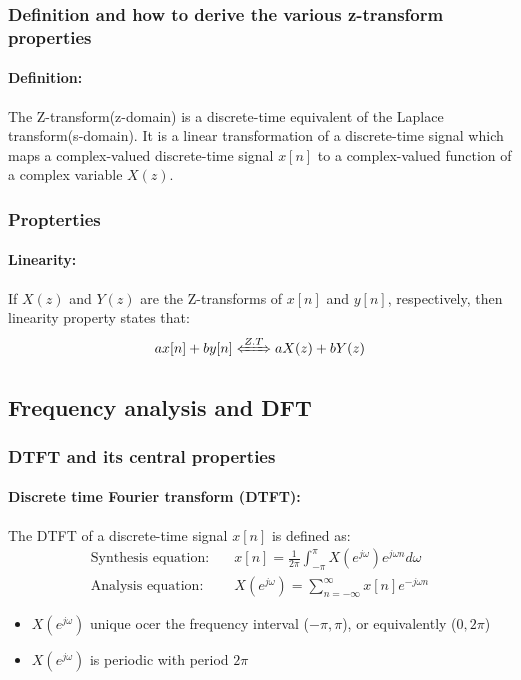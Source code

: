 \documentclass{article}
\begin{document}
\subsubsection{Definition and how to derive the various z-transform properties}
\paragraph{Definition:}
The Z-transform(z-domain) is a discrete-time equivalent of the Laplace transform(s-domain). It is a linear transformation of a discrete-time signal which maps a complex-valued discrete-time signal $x[n]$ to a complex-valued function of a complex variable $X(z)$.

\subsubsection*{Propterties}

\paragraph{Linearity:}
If $X(z)$ and $Y(z)$ are the Z-transforms of $x[n]$ and $y[n]$, respectively, then linearity property states that:
\begin{equation}
    ax[n] + by[n] \xLeftrightarrow{Z.T}  aX(z) + bY(z)
\end{equation}

\paragraph{}


\subsection{Frequency analysis and DFT}

\subsubsection{DTFT and its central properties}

\paragraph{Discrete time Fourier transform (DTFT):} The DTFT of a discrete-time signal $x[n]$ is defined as:
\begin{align}
    \text{Synthesis equation:} \quad & x[n] = \frac{1}{2\pi} \int_{-\pi}^{\pi} X(e^{j\omega})e^{j\omega n} d\omega \\
    \text{Analysis equation:} \quad & X(e^{j\omega}) = \sum_{n=-\infty}^{\infty} x[n]e^{-j\omega n}
\end{align}
\begin{itemize}
    \item $X(e^{j\omega})$ unique ocer the frequency interval ($-\pi,\pi$), or equivalently ($0,2\pi$)
    \item $X(e^{j\omega})$ is periodic with period $2\pi$
\end{itemize}
\end{document}
